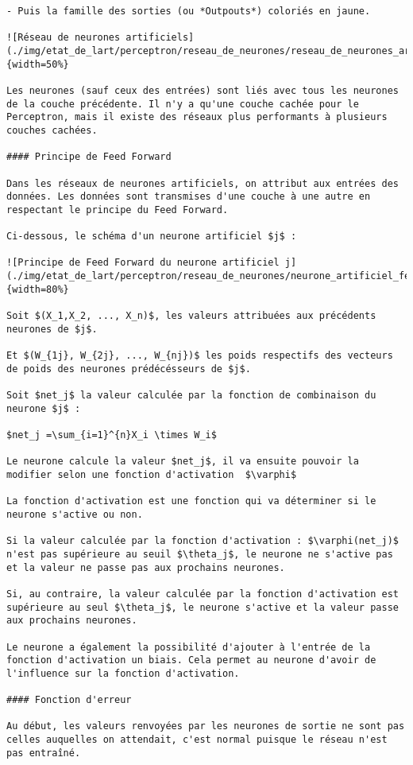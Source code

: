 \documentclass[
12pt,
french,
]{article}
\begin{document}
\begin{lstlisting}
- Puis la famille des sorties (ou *Outpouts*) coloriés en jaune.

![Réseau de neurones artificiels](./img/etat_de_lart/perceptron/reseau_de_neurones/reseau_de_neurones_artificiels.png){width=50%}

Les neurones (sauf ceux des entrées) sont liés avec tous les neurones de la couche précédente. Il n'y a qu'une couche cachée pour le Perceptron, mais il existe des réseaux plus performants à plusieurs couches cachées.

#### Principe de Feed Forward

Dans les réseaux de neurones artificiels, on attribut aux entrées des données. Les données sont transmises d'une couche à une autre en respectant le principe du Feed Forward.

Ci-dessous, le schéma d'un neurone artificiel $j$ :

![Principe de Feed Forward du neurone artificiel j](./img/etat_de_lart/perceptron/reseau_de_neurones/neurone_artificiel_feed_forward.png){width=80%}

Soit $(X_1,X_2, ..., X_n)$, les valeurs attribuées aux précédents neurones de $j$.

Et $(W_{1j}, W_{2j}, ..., W_{nj})$ les poids respectifs des vecteurs de poids des neurones prédécésseurs de $j$.

Soit $net_j$ la valeur calculée par la fonction de combinaison du neurone $j$ :

$net_j =\sum_{i=1}^{n}X_i \times W_i$

Le neurone calcule la valeur $net_j$, il va ensuite pouvoir la modifier selon une fonction d'activation  $\varphi$

La fonction d'activation est une fonction qui va déterminer si le neurone s'active ou non.

Si la valeur calculée par la fonction d'activation : $\varphi(net_j)$ n'est pas supérieure au seuil $\theta_j$, le neurone ne s'active pas et la valeur ne passe pas aux prochains neurones.

Si, au contraire, la valeur calculée par la fonction d'activation est supérieure au seul $\theta_j$, le neurone s'active et la valeur passe aux prochains neurones.

Le neurone a également la possibilité d'ajouter à l'entrée de la fonction d'activation un biais. Cela permet au neurone d'avoir de l'influence sur la fonction d'activation.

#### Fonction d'erreur

Au début, les valeurs renvoyées par les neurones de sortie ne sont pas celles auquelles on attendait, c'est normal puisque le réseau n'est pas entraîné.


\end{lstlisting}
\end{document}
